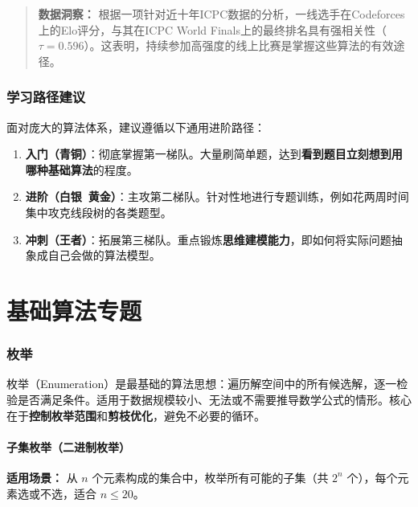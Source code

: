 \documentclass[12pt,a4paper]{ctexart}
\begin{document}
	\begin{quote}
		\textbf{数据洞察：} 根据一项针对近十年ICPC数据的分析，一线选手在Codeforces上的Elo评分，与其在ICPC World Finals上的最终排名具有强相关性（\( \tau = 0.596 \)）。这表明，持续参加高强度的线上比赛是掌握这些算法的有效途径。
	\end{quote}
	
	\section{学习路径建议}
	面对庞大的算法体系，建议遵循以下通用进阶路径：
	
	\begin{enumerate}[label=\arabic*.]
		\item \textbf{入门（青铜）}：彻底掌握第一梯队。大量刷简单题，达到\textbf{看到题目立刻想到用哪种基础算法}的程度。
		\item \textbf{进阶（白银~黄金）}：主攻第二梯队。针对性地进行专题训练，例如花两周时间集中攻克线段树的各类题型。
		\item \textbf{冲刺（王者）}：拓展第三梯队。重点锻炼\textbf{思维建模能力}，即如何将实际问题抽象成自己会做的算法模型。
	\end{enumerate}
	
	\begin{center}
	\end{center}
	
	\newpage
	
	\part{基础算法专题}
	
	\section{枚举}
	枚举（Enumeration）是最基础的算法思想：遍历解空间中的所有候选解，逐一检验是否满足条件。适用于数据规模较小、无法或不需要推导数学公式的情形。核心在于\textbf{控制枚举范围}和\textbf{剪枝优化}，避免不必要的循环。
	
	\subsection{子集枚举（二进制枚举）}
	\textbf{适用场景：} 从 \(n\) 个元素构成的集合中，枚举所有可能的子集（共 \(2^n\) 个），每个元素选或不选，适合 \(n \le 20\)。
	
\end{document}
